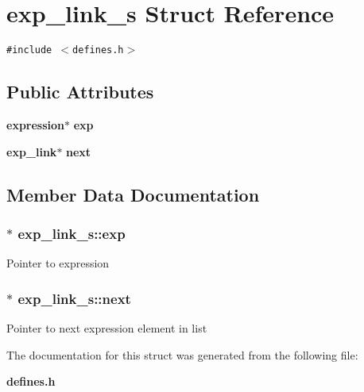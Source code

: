 \section{exp\_\-link\_\-s  Struct Reference}
\label{structexp__link__s}
{\tt \#include $<$defines.h$>$}

\subsection*{Public Attributes}
\begin{CompactItemize}
\item 
{\bf expression}$\ast$ {\bf exp}
\item 
{\bf exp\_\-link}$\ast$ {\bf next}
\end{CompactItemize}


\subsection{Member Data Documentation}
\subsubsection{ $\ast$ exp\_\-link\_\-s::exp}\label{structexp__link__s_m0}


Pointer to expression 
\subsubsection{ $\ast$ exp\_\-link\_\-s::next}\label{structexp__link__s_m1}


Pointer to next expression element in list 

The documentation for this struct was generated from the following file:\begin{CompactItemize}
\item 
{\bf defines.h}\end{CompactItemize}
